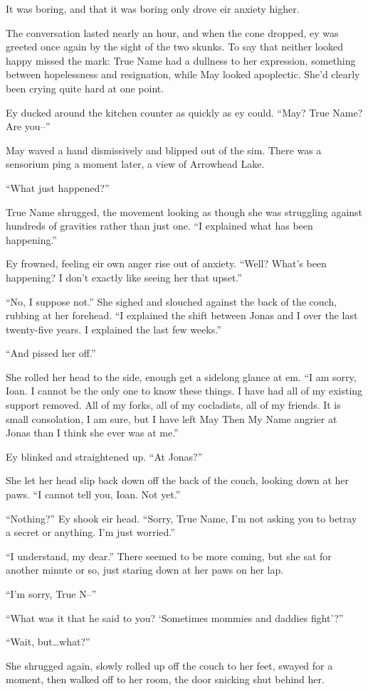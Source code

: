 It was boring, and that it was boring only drove eir anxiety higher.

The conversation lasted nearly an hour, and when the cone dropped, ey was greeted once again by the sight of the two skunks. To say that neither looked happy missed the mark: True Name had a dullness to her expression, something between hopelessness and resignation, while May looked apoplectic. She'd clearly been crying quite hard at one point.

Ey ducked around the kitchen counter as quickly as ey could. ``May? True Name? Are you--''

May waved a hand dismissively and blipped out of the sim. There was a sensorium ping a moment later, a view of Arrowhead Lake.

``What just happened?''

True Name shrugged, the movement looking as though she was struggling against hundreds of gravities rather than just one. ``I explained what has been happening.''

Ey frowned, feeling eir own anger rise out of anxiety. ``Well? What's been happening? I don't exactly like seeing her that upset.''

``No, I suppose not.'' She sighed and slouched against the back of the couch, rubbing at her forehead. ``I explained the shift between Jonas and I over the last twenty-five years. I explained the last few weeks.''

``And pissed her off.''

She rolled her head to the side, enough get a sidelong glance at em. ``I am sorry, Ioan. I cannot be the only one to know these things. I have had all of my existing support removed. All of my forks, all of my cocladists, all of my friends. It is small consolation, I am sure, but I have left May Then My Name angrier at Jonas than I think she ever was at me.''

Ey blinked and straightened up. ``At Jonas?''

She let her head slip back down off the back of the couch, looking down at her paws. ``I cannot tell you, Ioan. Not yet.''

``Nothing?'' Ey shook eir head. ``Sorry, True Name, I'm not asking you to betray a secret or anything. I'm just worried.''

``I understand, my dear.'' There seemed to be more coming, but she sat for another minute or so, just staring down at her paws on her lap.

``I'm sorry, True N--''

``What was it that he said to you? `Sometimes mommies and daddies fight'?''

``Wait, but\ldots what?''

She shrugged again, slowly rolled up off the couch to her feet, swayed for a moment, then walked off to her room, the door snicking shut behind her.
